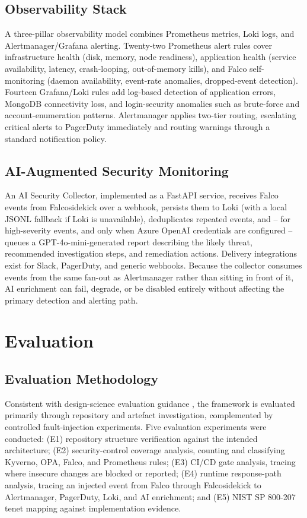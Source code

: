 \documentclass[conference]{IEEEtran}
\begin{document}
\subsection{Observability Stack}
A three-pillar observability model combines Prometheus metrics, Loki logs, and Alertmanager/Grafana alerting. Twenty-two Prometheus alert rules cover infrastructure health (disk, memory, node readiness), application health (service availability, latency, crash-looping, out-of-memory kills), and Falco self-monitoring (daemon availability, event-rate anomalies, dropped-event detection). Fourteen Grafana/Loki rules add log-based detection of application errors, MongoDB connectivity loss, and login-security anomalies such as brute-force and account-enumeration patterns. Alertmanager applies two-tier routing, escalating critical alerts to PagerDuty immediately and routing warnings through a standard notification policy.

\subsection{AI-Augmented Security Monitoring}
An AI Security Collector, implemented as a FastAPI service, receives Falco events from Falcosidekick over a webhook, persists them to Loki (with a local JSONL fallback if Loki is unavailable), deduplicates repeated events, and -- for high-severity events, and only when Azure OpenAI credentials are configured -- queues a GPT-4o-mini-generated report describing the likely threat, recommended investigation steps, and remediation actions. Delivery integrations exist for Slack, PagerDuty, and generic webhooks. Because the collector consumes events from the same fan-out as Alertmanager rather than sitting in front of it, AI enrichment can fail, degrade, or be disabled entirely without affecting the primary detection and alerting path.

\section{Evaluation}

\subsection{Evaluation Methodology}
Consistent with design-science evaluation guidance \cite{hevner2004}, the framework is evaluated primarily through repository and artefact investigation, complemented by controlled fault-injection experiments. Five evaluation experiments were conducted: (E1) repository structure verification against the intended architecture; (E2) security-control coverage analysis, counting and classifying Kyverno, OPA, Falco, and Prometheus rules; (E3) CI/CD gate analysis, tracing where insecure changes are blocked or reported; (E4) runtime response-path analysis, tracing an injected event from Falco through Falcosidekick to Alertmanager, PagerDuty, Loki, and AI enrichment; and (E5) NIST SP 800-207 tenet mapping against implementation evidence.
\end{document}
